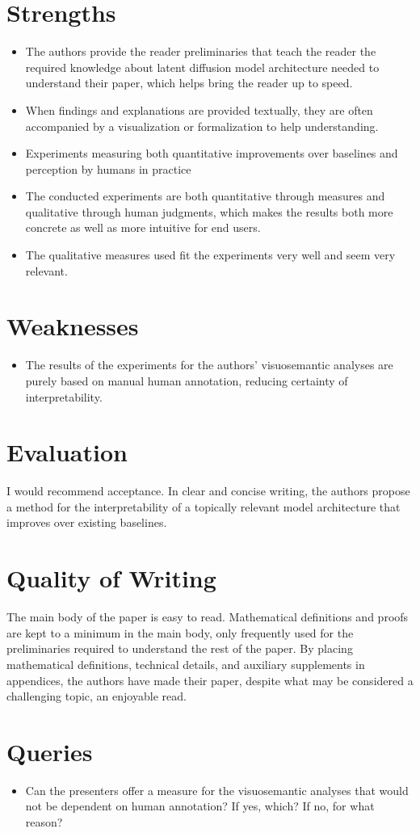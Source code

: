 \documentclass{IEEEtran}
\begin{document}
\section{Strengths}
\begin{itemize}
    \item The authors provide the reader preliminaries that teach the reader the required knowledge about latent diffusion model architecture needed to understand their paper, which helps bring the reader up to speed.
    \item When findings and explanations are provided textually, they are often accompanied by a visualization or formalization to help understanding.
    \item Experiments measuring both quantitative improvements over baselines and perception by humans in practice
    \item The conducted experiments are both quantitative through measures and qualitative through human judgments, which makes the results both more concrete as well as more intuitive for end users.
    \item The qualitative measures used fit the experiments very well and seem very relevant.
\end{itemize}

\section{Weaknesses}
\begin{itemize}
    \item The results of the experiments for the authors' visuosemantic analyses are purely based on manual human annotation, reducing certainty of interpretability.
\end{itemize}

\section{Evaluation}
I would recommend acceptance.
In clear and concise writing, the authors propose a method for the interpretability of a topically relevant model architecture that improves over existing baselines.

\section{Quality of Writing}
The main body of the paper is easy to read.
Mathematical definitions and proofs are kept to a minimum in the main body, only frequently used for the preliminaries required to understand the rest of the paper.
By placing mathematical definitions, technical details, and auxiliary supplements in appendices, the authors have made their paper, despite what may be considered a challenging topic, an enjoyable read.

\section{Queries}
\begin{itemize}
    \item Can the presenters offer a measure for the visuosemantic analyses that would not be dependent on human annotation? If yes, which? If no, for what reason?
\end{itemize}
\end{document}
